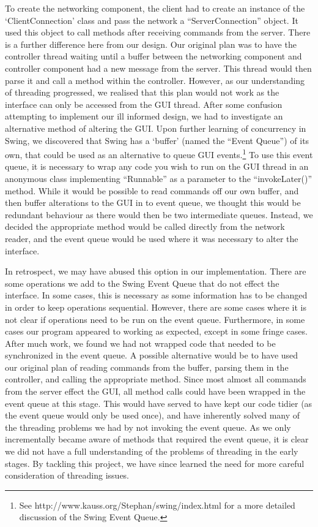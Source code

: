 To create the networking component, the client had to create an instance of the `ClientConnection' class and pass the network a ``ServerConnection'' object. It used this object to call methods after receiving commands from the server. There is a further difference here from our design. Our original plan was to have the controller thread waiting until a buffer between the networking component and controller component had a new message from the server. This thread would then parse it and call a method within the controller. However, as our understanding of threading progressed, we realised that this plan would not work as the interface can only be accessed from the GUI thread. After some confusion attempting to implement our ill informed design, we had to investigate an alternative method of altering the GUI. Upon further learning of concurrency in Swing, we discovered that Swing has a `buffer' (named the ``Event Queue'') of its own, that could be used as an alternative to queue GUI events.\footnote{See http://www.kauss.org/Stephan/swing/index.html for a more detailed discussion of the Swing Event Queue.} To use this event queue, it is necessary to wrap any code you wish to run on the GUI thread in an anonymous class implementing ``Runnable'' as a parameter to the ``invokeLater()'' method.  While it would be possible to read commands off our own buffer, and then buffer alterations to the GUI in to event queue, we thought this would be redundant behaviour as there would then be two intermediate queues. Instead, we decided the appropriate method would be called directly from the network reader, and the event queue would be used where it was necessary to alter the interface.

In retrospect, we may have abused this option in our implementation. There are some operations we add to the Swing Event Queue that do not effect the interface. In some cases, this is necessary as some information has to be changed in order to keep operations sequential. However, there are some cases where it is not clear if operations need to be run on the event queue. Furthermore, in some cases our program appeared to working as expected, except in some fringe cases. After much work, we found we had not wrapped code that needed to be synchronized in the event queue. A possible alternative would be to have used our original plan of reading commands from the buffer, parsing them in the controller, and calling the appropriate method. Since most almost all commands from the server effect the GUI, all method calls could have been wrapped in the event queue at this stage. This would have served to have kept our code tidier (as the event queue would only be used once), and have inherently solved many of the threading problems we had by not invoking the event queue. As we only incrementally became aware of methods that required the event queue, it is clear we did not have a full understanding of the problems of threading in the early stages. By tackling this project, we have since learned the need for more careful consideration of threading issues.

